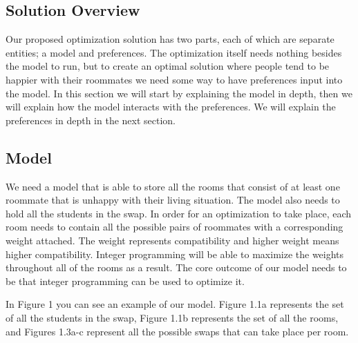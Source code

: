 \documentclass[12pt]{article}
\begin{document}
\begin{multicols}{2}
\section{Solution Overview}
Our proposed optimization solution has two parts, each of which are separate entities; a model and preferences. The optimization itself needs nothing besides the model to run, but to create an optimal solution where people tend to be happier with their roommates we need some way to have preferences input into the model. In this section we will start by explaining the model in depth, then we will explain how the model interacts with the preferences. We will explain the preferences in depth in the next section.

\subsection{Model}
We need a model that is able to store all the rooms that consist of at least one roommate that is unhappy with their living situation. The model also needs to hold all the students in the swap. In order for an optimization to take place, each room needs to contain all the possible pairs of roommates with a corresponding weight attached. The weight represents compatibility and higher weight means higher compatibility. Integer programming will be able to maximize the weights throughout all of the rooms as a result. The core outcome of our model needs to be that integer programming can be used to optimize it.

In Figure 1 you can see an example of our model. Figure 1.1a represents the set of all the students in the swap, Figure 1.1b represents the set of all the rooms, and Figures 1.3a-c represent all the possible swaps that can take place per room. 


\end{multicols}
\end{document}
